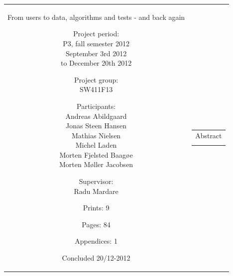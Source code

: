 \begin{nopagebreak}
{\begin{tabular}{cc}
{\begin{description}
From users to data, algorithms and tests - and back again

\end{description}

\parbox{8cm}{

\begin{description}
\item { Project period:}\\
   P3, fall semester 2012\\
   September 3rd 2012 \\
   to December 20th 2012
  \hspace{4cm}
\item { Project group:}\\
  SW411F13
  \hspace{4cm}
\item { Participants:}\\
Andreas Abildgaard \\
Jonas Steen Hansen \\
Mathias Nielsen \\
Michel Laden \\
Morten Fjelsted Baagøe \\
Morten Møller Jacobsen \\
\hspace{2cm}
\item { Supervisor:}\\
Radu Mardare
  
\end{description}
}
\begin{description}
\item { Prints: 9 }
\item { Pages: 84 } 
\item { Appendices: 1} 
\item { Concluded 20/12-2012} 
\end{description}
\vfill } &
\parbox{7cm}{
  \vspace{.15cm}
  \hfill 
  \begin{tabular}{l}
  { Abstract}\bigskip \\
  \fbox{
    \parbox{6.5cm}{\bigskip
     {\vfill{\small 
     \bigskip}}
     }}
   \end{tabular}}
\end{tabular}} \vspace{1.3cm}
\\ \\ 
\end{nopagebreak}
%
